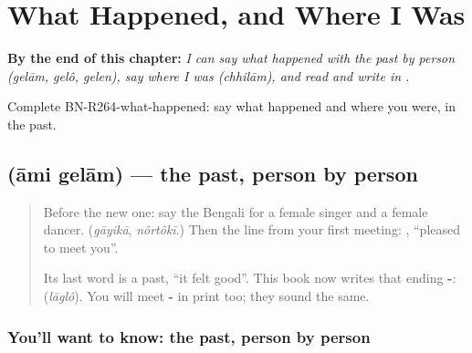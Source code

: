 
\chapter{What Happened, and Where I Was}
\label{ch:bn-what-happened-and-where-i-was}

\begin{chapteropening}
\textbf{By the end of this chapter:} \emph{I can say what happened with the past by person (gelām, gelô, gelen), say where I was (chhilām), and read and write  in .}

Complete BN-R264-what-happened: say what happened and where you were, in the past.
\end{chapteropening}

\section[\texorpdfstring{\bn{আমি} \bn{গেলাম} (āmi gelām)}{আমি গেলাম (āmi gelām)}]{  (āmi gelām) — the past, person by person}

\label{lesson:BN-C264-gelam}



\begin{quote}
Before the new one: say the Bengali for a female singer and a female dancer. (\emph{gāyikā}, \emph{nôrtôkī}.) Then the line from your first meeting: \textbf{   }, \textquotedblleft{}pleased to meet you\textquotedblright{}.

Its last word is a past, \textquotedblleft{}it felt good\textquotedblright{}. This book now writes that ending \textbf{-}: \textbf{} (\emph{lāglô}). You will meet \textbf{-} in print too; they sound the same.
\end{quote}

\subsection*{You'll want to know: the past, person by person}
\begin{quote}
\textbf{   }
\end{quote}

